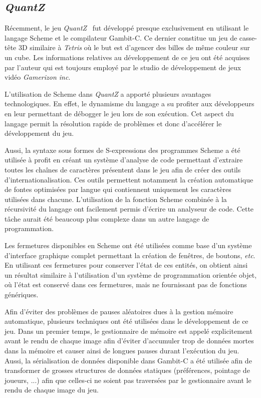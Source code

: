 \documentclass[12pt,twoside,letterpaper,francais]{book}
\newcommand{\scheme}[1]{\selectlanguage{english}{\tt #1}\selectlanguage{french}}
\begin{document}
\FloatBarrier
\subsection{\textit{QuantZ}}
Récemment, le jeu \textit{QuantZ}~\cite{Quantz} fut développé presque
exclusivement en utilisant le langage Scheme et le compilateur
Gambit-C. Ce dernier constitue un jeu de casse-tête 3D similaire à
\textit{Tetris} où le but est d'agencer des billes de même couleur sur
un cube. Les informations relatives au dévelop\-pement de ce jeu ont
été acquises par l'auteur qui est toujours employé par le studio de
dévelop\-pement de jeux vidéo \textit{Gamerizon inc}.

L'utilisation de Scheme dans \textit{QuantZ} a apporté plusieurs
avantages technologiques. En effet, le dynamisme du langage a su
profiter aux développeurs en leur permettant de débogger le jeu lors
de son exécution. Cet aspect du langage permit la résolution rapide de
problèmes et donc d'accélérer le dévelop\-pement du jeu.

Aussi, la syntaxe sous formes de S-expressions des programmes Scheme a
été utilisée à profit en créant un système d'analyse de code
permettant d'extraire toutes les chaînes de caractères présentent dans
le jeu afin de créer des outils d'internationalisation. Ces outils
permettent notamment la création automatique de fontes optimisées par
langue qui contiennent uniquement les caractères utilisées dans
chacune. L'utilisation de la fonction Scheme \scheme{read} combinée à
la récursivité du langage ont facilement permis d'écrire un analyseur
de code. Cette tâche aurait été beaucoup plus complexe dans un autre
langage de programmation.

Les fermetures disponibles en Scheme ont été utilisées comme base d'un
système d'interface graphique complet permettant la création de
fenêtres, de boutons, \textit{etc}. En utilisant ces fermetures pour
conserver l'état de ces entités, on obtient ainsi un résultat
similaire à l'utilisation d'un système de programmation orientée
objet, où l'état est conservé dans ces fermetures, mais ne fournissant
pas de fonctions génériques.

Afin d'éviter des problèmes de pauses aléatoires dues à la gestion
mémoire automatique, plusieurs techniques ont été utilisées dans le
dévelop\-pement de ce jeu. Dans un premier temps, le gestionnaire de
mémoire est appelé explicitement avant le rendu de chaque image afin
d'éviter d'accumuler trop de données mortes dans la mémoire et causer
ainsi de longues pauses durant l'exécution du jeu. Aussi, la
sérialisation de données disponible dans Gambit-C a été utilisée afin
de transformer de grosses structures de données statiques
(préférences, pointage de joueurs, ...) afin que celles-ci ne soient
pas traversées par le gestionnaire avant le rendu de chaque image du
jeu.
\end{document}
